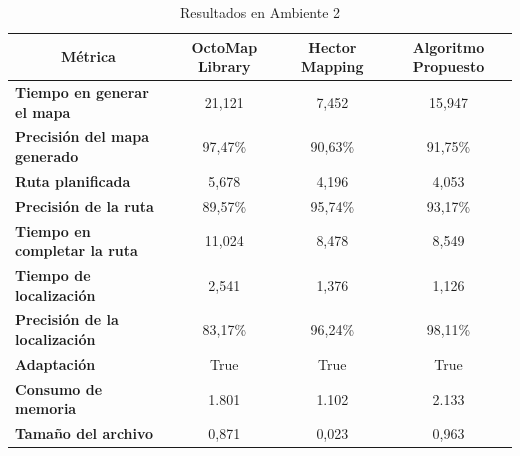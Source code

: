 \begin{table}[H]
\centering
\begin{tabular}{@{}lccc@{}}
\toprule
\multicolumn{1}{|c|}{\textbf{Métrica}} &
  \multicolumn{1}{c|}{\textbf{OctoMap Library}} &
  \multicolumn{1}{c|}{\textbf{Hector Mapping}} &
  \multicolumn{1}{c|}{\textbf{Algoritmo Propuesto}} \\ \midrule
\multicolumn{1}{|l|}{\textbf{Tiempo en generar el mapa}}    & \multicolumn{1}{c|}{21,121} & \multicolumn{1}{c|}{7,452} & \multicolumn{1}{c|}{15,947} \\ \midrule
\multicolumn{1}{|l|}{\textbf{Precisión del mapa generado}}  & \multicolumn{1}{c|}{97,47\%} & \multicolumn{1}{c|}{90,63\%} & \multicolumn{1}{c|}{91,75\%} \\ \midrule
\multicolumn{1}{|l|}{\textbf{Ruta planificada}}             & \multicolumn{1}{c|}{5,678} & \multicolumn{1}{c|}{4,196} & \multicolumn{1}{c|}{4,053} \\ \midrule
\multicolumn{1}{|l|}{\textbf{Precisión de la ruta}}         & \multicolumn{1}{c|}{89,57\%} & \multicolumn{1}{c|}{95,74\%} & \multicolumn{1}{c|}{93,17\%} \\ \midrule
\multicolumn{1}{|l|}{\textbf{Tiempo en completar la ruta}}  & \multicolumn{1}{c|}{11,024} & \multicolumn{1}{c|}{8,478} & \multicolumn{1}{c|}{8,549} \\ \midrule
\multicolumn{1}{|l|}{\textbf{Tiempo de localización}}       & \multicolumn{1}{c|}{2,541} & \multicolumn{1}{c|}{1,376} & \multicolumn{1}{c|}{1,126} \\ \midrule
\multicolumn{1}{|l|}{\textbf{Precisión de la localización}} & \multicolumn{1}{c|}{83,17\%} & \multicolumn{1}{c|}{96,24\%} & \multicolumn{1}{c|}{98,11\%} \\ \midrule
\multicolumn{1}{|l|}{\textbf{Adaptación}}                   & \multicolumn{1}{c|}{True} & \multicolumn{1}{c|}{True} & \multicolumn{1}{c|}{True} \\ \midrule
\multicolumn{1}{|l|}{\textbf{Consumo de memoria}}           & \multicolumn{1}{c|}{1.801} & \multicolumn{1}{c|}{1.102} & \multicolumn{1}{c|}{2.133} \\ \midrule
\multicolumn{1}{|l|}{\textbf{Tamaño del archivo}}           & \multicolumn{1}{c|}{0,871} & \multicolumn{1}{c|}{0,023} & \multicolumn{1}{c|}{0,963} \\ \bottomrule
\end{tabular}
\caption{Resultados en Ambiente 2}
\label{tab:resultados_ambiente_2}
\end{table}

